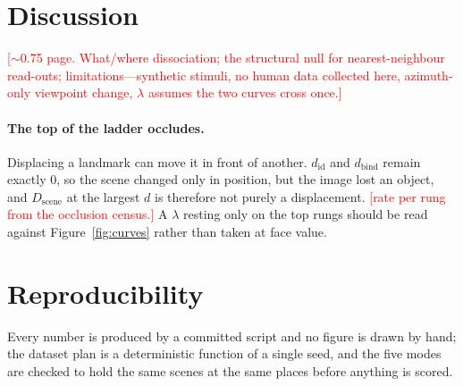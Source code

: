 \documentclass{article}
\newcommand{\TODO}[1]{\textcolor{red}{[#1]}}
\newcommand{\dbind}{d_{\mathrm{bind}}}
\newcommand{\did}{d_{\mathrm{id}}}
\begin{document}
\section{Discussion}
\label{sec:discussion}

\TODO{$\sim$0.75 page. What/where dissociation; the structural null for
nearest-neighbour read-outs; limitations---synthetic stimuli, no human data
collected here, azimuth-only viewpoint change, $\lambda$ assumes the two curves
cross once.}

\paragraph{The top of the ladder occludes.} Displacing a landmark can move it in
front of another. $\did$ and $\dbind$ remain exactly $0$, so the scene changed
only in position, but the image lost an object, and $D_{\text{scene}}$ at the
largest $d$ is therefore not purely a displacement. \TODO{rate per rung from the
occlusion census.} A $\lambda$ resting only on the top rungs should be read
against Figure~\ref{fig:curves} rather than taken at face value.

\section*{Reproducibility}
Every number is produced by a committed script and no figure is drawn by hand;
the dataset plan is a deterministic function of a single seed, and the five modes
are checked to hold the same scenes at the same places before anything is scored.



\end{document}
